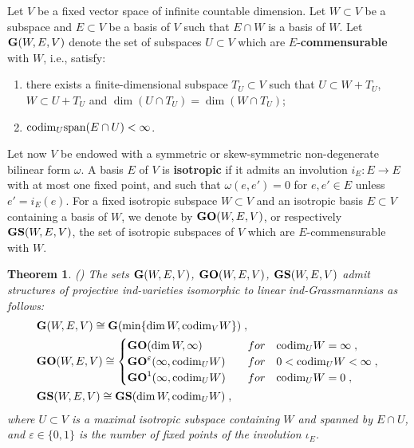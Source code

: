 \documentclass[12pt]{amsart}
\def\eps {\varepsilon}
\newtheorem{theorem}{Theorem}[section]
\begin{document}
Let $V$ be a fixed vector space of infinite countable dimension. Let $W\subset V$ be a subspace and $E\subset V$ be a basis of $V$ such that $E\cap W$ is a basis of $W$. Let ${\bf G}(W,E,V)$ denote the set of subspaces $U\subset V$ which are $E$-{\bf commensurable} with $W$, i.e., satisfy:
\begin{enumerate}
\item[$\bullet$] there exists a finite-dimensional subspace $T_U\subset V$ such that $U\subset W+T_U$, $W\subset U+T_U$ and $\dim(U\cap T_U)=\dim(W\cap T_U)$;
\item[$\bullet$] ${\rm codim}_U{\rm span}(E\cap U) <\infty$.
\end{enumerate}

Let now $V$ be endowed with a symmetric or skew-symmetric non-degenerate bilinear form $\omega$. A basis $E$ of $V$ is {\bf isotropic} if it admits an involution $i_E:E\to E$ with at most one fixed point, and such that $\omega(e,e')=0$ for $e,e'\in E$ unless $e'=i_E(e)$. For a fixed isotropic subspace $W\subset V$ and an isotropic basis $E\subset V$ containing a basis of $W$, we denote by ${\bf GO}(W,E,V)$, or respectively ${\bf GS}(W,E,V)$, the set of isotropic subspaces of $V$ which are $E$-commensurable with $W$.


\begin{theorem}\label{Theo Dimitrov Penkov} {\rm (\cite{Dimitrov-Penkov})}
The sets ${\bf G}(W,E,V)$, ${\bf GO}(W,E,V)$, ${\bf GS}(W,E,V)$ admit structures of projective ind-varieties isomorphic to linear ind-Grassmannians as follows:
\begin{align*}
& {\bf G}(W,E,V) \cong {\bf G}(\min\{\dim W,{\rm codim}_VW\})\;, \\
& {\bf GO}(W,E,V) \cong
\begin{cases}
{\bf GO}(\dim W,\infty) & \quad for \quad {\rm codim}_U W=\infty \;,\\
{\bf GO}^\eps(\infty,{\rm codim}_U W) & \quad for \quad 0<{\rm codim}_U W<\infty \;, \\
{\bf GO}^1(\infty,{\rm codim}_U W) & \quad for \quad {\rm codim}_U W=0 \;,
\end{cases} \\ 
& {\bf GS}(W,E,V) \cong {\bf GS}(\dim W,{\rm codim}_UW)\;,
\end{align*}
where $U\subset V$ is a maximal isotropic subspace containing $W$ and spanned by $E\cap U$, and $\eps\in\{0,1\}$ is the number of fixed points of the involution $\iota_E$.
\end{theorem}
\end{document}
